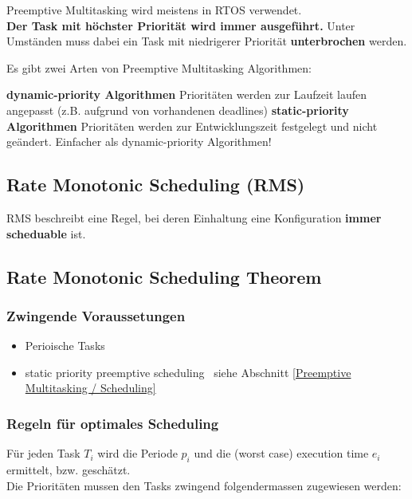 Preemptive Multitasking wird meistens in RTOS verwendet. \\
\textbf{Der Task mit höchster Priorität wird immer ausgeführt.} Unter Umständen muss dabei ein Task mit niedrigerer Priorität
\textbf{unterbrochen} werden. 

\vspace{0.1 cm}

Es gibt zwei Arten von Preemptive Multitasking Algorithmen:

\begin{outline}
    \1 \textbf{dynamic-priority Algorithmen}
        \2 Prioritäten werden zur Laufzeit laufen angepasst (z.B. aufgrund von vorhandenen deadlines)
    \1 \textbf{static-priority Algorithmen}
        \2 Prioritäten werden zur Entwicklungszeit festgelegt und nicht geändert.
        \2 Einfacher als dynamic-priority Algorithmen!
\end{outline}


\subsection{Rate Monotonic Scheduling (RMS)}


RMS beschreibt eine Regel, bei deren Einhaltung eine Konfiguration \textbf{immer scheduable} ist.


\subsection{Rate Monotonic Scheduling Theorem}

\subsubsection{Zwingende Voraussetungen}

\begin{itemize}
    \item Perioische Tasks
    \item static priority preemptive scheduling \textrightarrow\ siehe Abschnitt \ref{Preemptive Multitasking / Scheduling}
\end{itemize}


\subsubsection{Regeln für optimales Scheduling}

Für jeden Task $T_i$ wird die Periode $p_i$ und die (worst case) execution time $e_i$ ermittelt, bzw. geschätzt. \\
Die Prioritäten mussen den Tasks zwingend folgendermassen zugewiesen werden:

